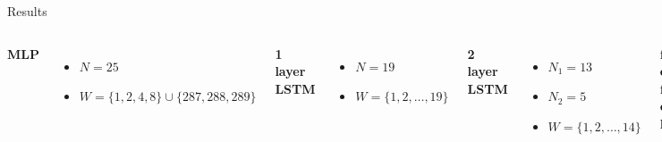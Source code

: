 \documentclass{beamer}
\begin{document}
  \begin{frame}{Results}
    \begin{columns}[c]
      \textbf{MLP}
      \begin{itemize}
	\item \(N=25\)
	\item \(W = \{1,2,4,8\} \cup \{287,288,289\}\)
      \end{itemize}
    
      \textbf{1 layer LSTM}
      \begin{itemize}
	\item \(N = 19\)
	\item \(W = \{1,2,\ldots,19\}\)
      \end{itemize}
      
      \textbf{2 layer LSTM}
      \begin{itemize}
	\item \(N_1 = 13\)
	\item \(N_2 = 5\)
	\item \(W = \{1,2,\ldots,14\}\)
      \end{itemize}
    
      \textbf{forecast error for different horizons}
      \begin{figure}
	\includegraphics[width=1.1\textwidth]{images/nn_errors.pdf}
      \end{figure}
    \end{columns}
  \end{frame}
  
\end{document}
